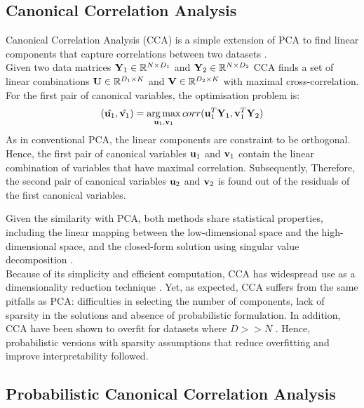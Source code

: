 \subsection{Canonical Correlation Analysis} \label{cca}
Canonical Correlation Analysis (CCA) is a simple extension of PCA to find linear components that capture correlations between two datasets \cite{Hotteling1936,Hardle2007}.\\
Given two data matrices ${\bf Y}_1 \in \mathbb{R}^{N \times D_1}$ and ${\bf Y}_2 \in \mathbb{R}^{N \times D_2}$ CCA finds a set of linear combinations ${\bf U} \in \mathbb{R}^{D_1 \times K}$ and ${\bf V} \in \mathbb{R}^{D_2 \times K}$ with maximal cross-correlation.
For the first pair of canonical variables, the optimisation problem is:
\[
	(\hat{{\bf u}_1}, \hat{{\bf v}_1}) = \operatorname*{arg\,max}_{{\bf u}_1,{\bf v}_1} corr({\bf u}_{1}^T {\bf Y}_1, {\bf v}_{1}^T {\bf Y}_2)
\]
As in conventional PCA, the linear components are constraint to be orthogonal. Hence, the first pair of canonical variables ${\bf u}_1$ and ${\bf v}_1$ contain the linear combination of variables that have maximal correlation. Subsequently, Therefore, the second pair of canonical variables ${\bf u}_2$ and ${\bf v}_2$ is found out of the residuals of the first canonical variables.

Given the similarity with PCA, both methods share statistical properties, including the linear mapping between the low-dimensional space and the high-dimensional space, and the closed-form solution using singular value decomposition \cite{Hotteling1936,Hardle2007}.\\
Because of its simplicity and efficient computation, CCA has widespread use as a dimensionality reduction technique \cite{Hardle2007}. Yet, as expected, CCA suffers from the same pitfalls as PCA: difficulties in selecting the number of components, lack of sparsity in the solutions and absence of probabilistic formulation. In addition, CCA have been shown to overfit for datasets where $D>>N$ \cite{McCabe2018,Guo2016}. Hence, probabilistic versions with sparsity assumptions that reduce overfitting and improve interpretability followed.


\subsection{Probabilistic Canonical Correlation Analysis} \label{section_probabilisticCCA}

